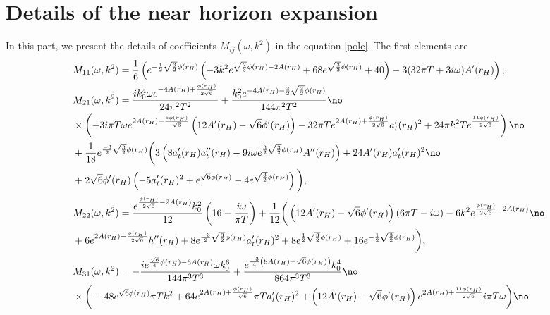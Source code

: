 \documentclass[preprintnumbers,aps,prd,longbibliography,nofootinbib,nobibnotes,amsmath,amssymb]{revtex4}
\begin{document}
\section{Details of the near horizon expansion}\label{Appendix3}
In this part, we present the details of coefficients $M_{i j}(\omega, k^2)$ in the equation \eqref{pole}. The first elements are
\begin{align}
	&M_{1 1}(\omega, k^2) = \frac{1}{6} \left(e^{-\frac{1}{2} \sqrt{\frac{3}{2}} \phi(r_H)} \left(-3 k^2 e^{\sqrt{\frac{2}{3}} \phi(r_H)-2 A(r_H)}+68 e^{\sqrt{\frac{3}{2}} \phi(r_H)}+40\right)-3 (32 \pi  T+3 i \omega ) A'(r_H)\right),\nonumber\\
	&M_{2 1}(\omega, k^2) = \frac{i k_0^4 \omega  e^{-4 A(r_H)+\frac{\phi(r_H)}{2 \sqrt{6}}}}{24 \pi ^2 T^2} + \frac{k_0^2 e^{-4 A(r_H)-\frac{3}{2} \sqrt{\frac{3}{2}} \phi(r_H)}}{144 \pi ^2 T^2} \no\\
	& \times \left(-3 i \pi  T \omega  e^{2 A(r_H)+\frac{5 \phi(r_H)}{\sqrt{6}}} \left(12 A'(r_H)-\sqrt{6} \phi'(r_H)\right)-32 \pi  T e^{2 A(r_H)+\frac{\phi(r_H)}{2 \sqrt{6}}} a_t'(r_H)^2+24 \pi  k^2 T e^{\frac{11 \phi(r_H)}{2 \sqrt{6}}}\right)\no\\
	&+\frac{1}{18} e^{\frac{-3}{2} \sqrt{\frac{3}{2}} \phi(r_H)} \bigg(3 \left(8 a_t'(r_H) a_t''(r_H)-9 i \omega  e^{\frac{3}{2} \sqrt{\frac{3}{2}} \phi(r_H)} A''(r_H)\right)+24 A'(r_H) a_t'(r_H)^2\no\\
	&+2 \sqrt{6} \phi'(r_H) \left(-5 a_t'(r_H)^2+e^{\sqrt{6} \phi(r_H)}-4 e^{\sqrt{\frac{3}{2}} \phi(r_H)}\right)\bigg),\nonumber\\
	&M_{2 2}(\omega, k^2) = \frac{e^{\frac{\phi(r_H)}{2 \sqrt{6}}-2 A(r_H)} k_0^2}{12}  \left(16 -\frac{i \omega }{\pi  T}\right) + \frac{1}{12} \bigg(\left(12 A'(r_H) - \sqrt{6}  \phi'(r_H) \right) (6 \pi  T-i \omega ) -6 k^2 e^{\frac{\phi(r_H)}{2 \sqrt{6}}-2 A(r_H)} \no\\
	&+6 e^{2 A(r_H)-\frac{\phi(r_H)}{2 \sqrt{6}}} h''(r_H)+8 e^{\frac{-3}{2} \sqrt{\frac{3}{2}} \phi(r_H)} a_t'(r_H)^2  +8 e^{\frac{1}{2} \sqrt{\frac{3}{2}} \phi(r_H)}+16 e^{-\frac{1}{2} \sqrt{\frac{3}{2}} \phi(r_H)}\bigg),\nonumber\\
		&M_{3 1}(\omega, k^2) =-\frac{i e^{\frac{\sqrt{6}}{4} \phi(r_H)-6 A(r_H)} \omega  k_0^6}{144 \pi ^3 T^3}+\frac{e^{\frac{-3}{4}  \left(8 A(r_H)+\sqrt{6} \phi(r_H)\right)} k_0^4 }{864 \pi ^3 T^3}\no\\
		&\times \bigg(-48 e^{\sqrt{6} \phi(r_H)} \pi  T k^2+64 e^{2 A(r_H)+\frac{\phi(r_H)}{\sqrt{6}}} \pi  T a_t'(r_H)^2+\left(12 A'(r_H) - \sqrt{6}  \phi'(r_H) \right)  e^{2 A(r_H)+\frac{11\phi(r_H)}{2\sqrt{6}}} i \pi  T \omega  \bigg)\no\\

\end{align}
\end{document}
